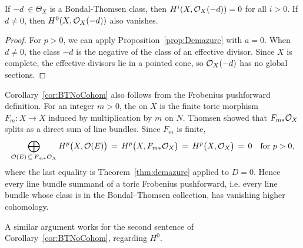 \documentclass{amsart}
\begin{document}
\begin{cor}\label{cor:BTNoCohom}
    If $-d\ \in \Theta_X$ is a Bondal-Thomsen class, then $H^i(X,{\mathcal O}_X(-d))=0$ for all $i>0$. If $d\ne 0$, then $H^0(X,{\mathcal O}_X(-d))$ also vanishes.
\end{cor}
\begin{proof}
    For $p>0$, we can apply Proposition~\ref{prop:Demazure} with $a=0$.  When $d\ne 0$, the class $-d$ is the negative of the class of an effective divisor. Since $X$ is complete, the effective divisors lie in a pointed cone,  so 
    ${\mathcal O}_X(-d)$ has no global sections.
\end{proof}

\begin{example}\label{ex:frobeniussplit}
  Corollary~\ref{cor:BTNoCohom} also follows from the Frobenius pushforward definition. For an integer $m>0$, the  on $X$ is the finite toric morphism $F_m\colon X\to X$ induced by multiplication by $m$ on $N$. Thomsen \cite{Thomsen00} showed that $F_{m*}{\mathcal O}_X$ splits as a direct sum of line bundles. Since $F_m$ is finite,
  \[
  \bigoplus_{{\mathcal O}(E)\,\subseteq\, F_{m*}{\mathcal O}_X} H^p\bigl(X,{\mathcal O}(E)\bigr) \,=\, H^p\bigl(X,F_{m*}{\mathcal O}_X\bigr) \,=\, H^p\bigl(X,{\mathcal O}_X\bigr) \,=\, 0 \quad\text{for } p>0,
  \]
  where the last equality is Theorem~\ref{thm:demazure} applied to $D=0$. Hence every line bundle summand of a toric Frobenius pushforward, i.e. every line bundle whose class is in the Bondal--Thomsen collection, has vanishing higher cohomology. 

 A similar argument works for the second sentence of Corollary~\ref{cor:BTNoCohom}, regarding $H^0$.
\end{example}
\end{document}
